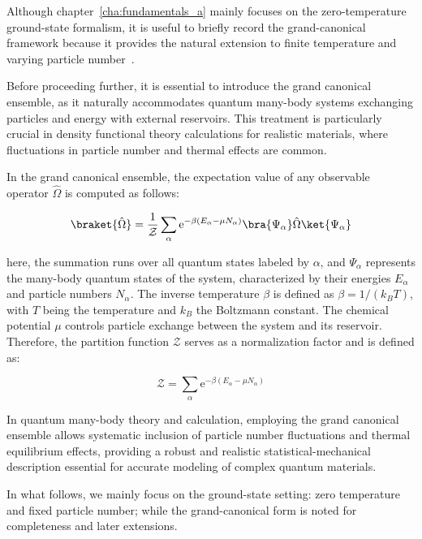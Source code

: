 Although chapter~\ref{cha:fundamentals_a} mainly focuses on the zero-temperature ground-state formalism,
it is useful to briefly record the grand-canonical framework because it provides the natural extension to finite temperature and varying particle number~\cite{gould2026ensemblization}.

Before proceeding further, it is essential to introduce the grand canonical ensemble, as it naturally accommodates quantum many-body systems exchanging particles and energy with external reservoirs.
This treatment is particularly crucial in density functional theory calculations for realistic materials, where fluctuations in particle number and thermal effects are common.

In the grand canonical ensemble, the expectation value of any observable operator $\hat{\Omega}$ is computed as follows:

\begin{equation}
    \braket{\hat{\Omega}} 
    = \frac{1}{\mathcal{Z}}\sum_{\alpha}\mathrm{e}^{-\beta(E_{\alpha}-\mu N_{\alpha})}\bra{\Psi_{\alpha}}\hat{\Omega}\ket{\Psi_{\alpha}}
\label{grand_canonical}
\end{equation}

here, the summation runs over all quantum states labeled by $\alpha$,
and $\Psi_{\alpha}$ represents the many-body quantum states of the system, characterized by their energies $E_{\alpha}$ and particle numbers $N_{\alpha}$.
The inverse temperature $\beta$ is defined as $\beta = 1/(k_B T)$, with $T$ being the temperature and $k_B$ the Boltzmann constant.
The chemical potential $\mu$ controls particle exchange between the system and its reservoir.
Therefore, the partition function $\mathcal{Z}$ serves as a normalization factor and is defined as:

\begin{equation}
    \mathcal{Z} = \sum_{\alpha} \mathrm{e}^{-\beta(E_{\alpha}-\mu N_{\alpha})}
\label{partition_function}
\end{equation}

In quantum many-body theory and calculation, employing the grand canonical ensemble allows systematic inclusion of particle number fluctuations and thermal equilibrium effects, providing a robust and realistic statistical-mechanical description essential for accurate modeling of complex quantum materials.

In what follows, we mainly focus on the ground-state setting: zero temperature and fixed particle number; while the grand-canonical form is noted for completeness and later extensions.

